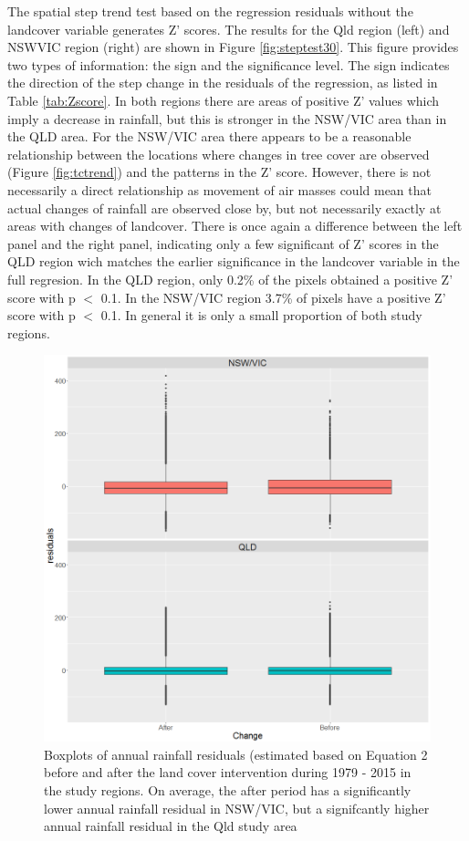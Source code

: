 \documentclass[fleqn,10pt,lineno]{wlpeerj} %
\begin{document}
The spatial step trend test based on the regression residuals without
the landcover variable generates Z' scores. The results for the Qld
region (left) and NSWVIC region (right) are shown in Figure
\ref{fig:steptest30}. This figure provides two types of information: the
sign and the significance level. The sign indicates the direction of the
step change in the residuals of the regression, as listed in Table
\ref{tab:Zscore}. In both regions there are areas of positive Z' values
which imply a decrease in rainfall, but this is stronger in the NSW/VIC
area than in the QLD area. For the NSW/VIC area there appears to be a
reasonable relationship between the locations where changes in tree
cover are observed (Figure \ref{fig:tctrend}) and the patterns in the Z'
score. However, there is not necessarily a direct relationship as
movement of air masses could mean that actual changes of rainfall are
observed close by, but not necessarily exactly at areas with changes of
landcover. There is once again a difference between the left panel and
the right panel, indicating only a few significant of Z' scores in the
QLD region wich matches the earlier significance in the landcover
variable in the full regresion. In the QLD region, only 0.2\% of the
pixels obtained a positive Z' score with p \(<\) 0.1. In the NSW/VIC
region 3.7\% of pixels have a positive Z' score with p \(<\) 0.1. In
general it is only a small proportion of both study regions.

\begin{figure}
\includegraphics[width=0.7\linewidth]{figures/ResidualBoxplotchange} \caption{Boxplots of annual rainfall residuals (estimated based on Equation 2 before and after the land cover intervention during 1979 - 2015 in the study regions. On average, the after period has a significantly lower annual rainfall residual in NSW/VIC, but a signifcantly higher annual rainfall residual in the Qld study area}\label{fig:meandiff}
\end{figure}
\end{document}
